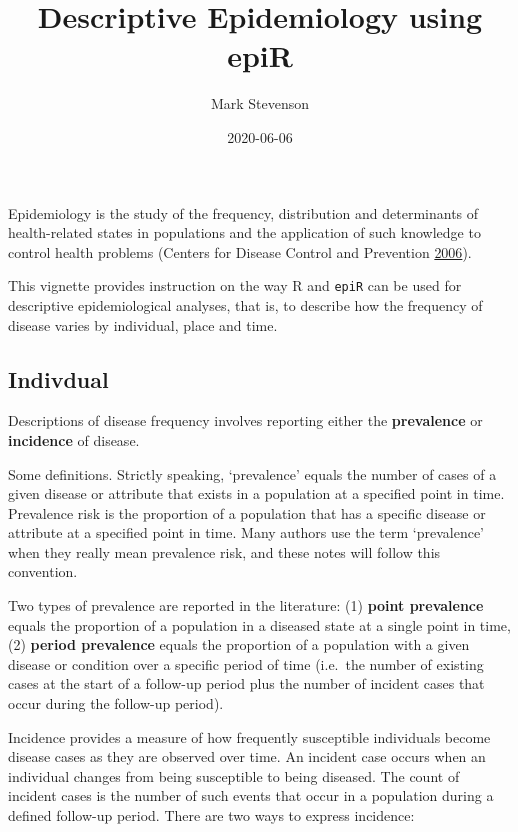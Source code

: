 \documentclass[
]{article}
\title{Descriptive Epidemiology using epiR}
\author{Mark Stevenson}
\date{2020-06-06}
\begin{document}
\maketitle

\setmainfont{Calibri Light}

Epidemiology is the study of the frequency, distribution and
determinants of health-related states in populations and the application
of such knowledge to control health problems (Centers for Disease
Control and Prevention \protect\hyperlink{ref-cdc:2006}{2006}).

This vignette provides instruction on the way R and \texttt{epiR} can be
used for descriptive epidemiological analyses, that is, to describe how
the frequency of disease varies by individual, place and time.

\hypertarget{indivdual}{%
\subsection{Indivdual}\label{indivdual}}

Descriptions of disease frequency involves reporting either the
\textbf{prevalence} or \textbf{incidence} of disease.

Some definitions. Strictly speaking, `prevalence' equals the number of
cases of a given disease or attribute that exists in a population at a
specified point in time. Prevalence risk is the proportion of a
population that has a specific disease or attribute at a specified point
in time. Many authors use the term `prevalence' when they really mean
prevalence risk, and these notes will follow this convention.

Two types of prevalence are reported in the literature: (1)
\textbf{point prevalence} equals the proportion of a population in a
diseased state at a single point in time, (2) \textbf{period prevalence}
equals the proportion of a population with a given disease or condition
over a specific period of time (i.e.~the number of existing cases at the
start of a follow-up period plus the number of incident cases that occur
during the follow-up period).

Incidence provides a measure of how frequently susceptible individuals
become disease cases as they are observed over time. An incident case
occurs when an individual changes from being susceptible to being
diseased. The count of incident cases is the number of such events that
occur in a population during a defined follow-up period. There are two
ways to express incidence:
\end{document}
